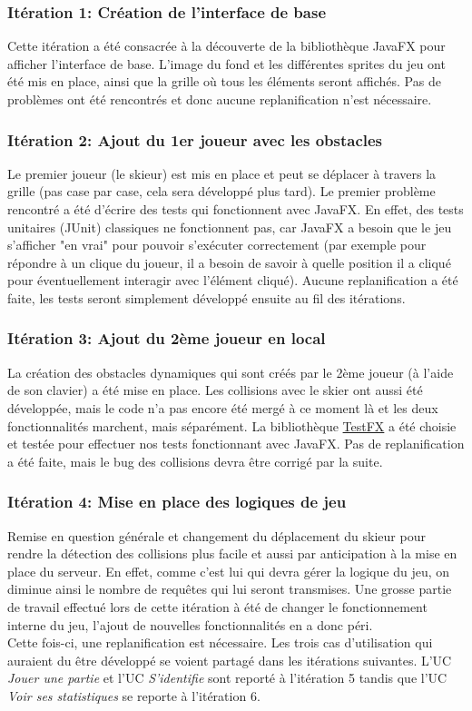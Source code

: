 \documentclass[a4paper,11pt]{article}
\begin{document}
	\subsubsection{Itération 1: Création de l'interface de base}
	Cette itération a été consacrée à la découverte de la bibliothèque JavaFX pour afficher l'interface de base. L'image du fond et les différentes sprites du jeu ont été mis en place, ainsi que la grille où tous les éléments seront affichés. Pas de problèmes ont été rencontrés et donc aucune replanification n'est nécessaire.
	
	\subsubsection{Itération 2: Ajout du 1er joueur avec les obstacles}
	Le premier joueur (le skieur) est mis en place et peut se déplacer à travers la grille (pas case par case, cela sera développé plus tard). Le premier problème rencontré a été d'écrire des tests qui fonctionnent avec JavaFX. En effet, des tests unitaires (JUnit) classiques ne fonctionnent pas, car JavaFX a besoin que le jeu s'afficher "en vrai" pour pouvoir s'exécuter correctement (par exemple pour répondre à un clique du joueur, il a besoin de savoir à quelle position il a cliqué pour éventuellement interagir avec l'élément cliqué). Aucune replanification a été faite, les tests seront simplement développé ensuite au fil des itérations.
	
	\subsubsection{Itération 3: Ajout du 2ème joueur en local}
	La création des obstacles dynamiques qui sont créés par le 2ème joueur (à l'aide de son clavier) a été mise en place. Les collisions avec le skier ont aussi été développée, mais le code n'a pas encore été mergé à ce moment là et les deux fonctionnalités marchent, mais séparément. La bibliothèque \href{https://github.com/TestFX/TestFX}{TestFX}	a été choisie et testée pour effectuer nos tests fonctionnant avec JavaFX. Pas de replanification a été faite, mais le bug des collisions devra être corrigé par la suite.
	
	\subsubsection{Itération 4: Mise en place des logiques de jeu}
	Remise en question générale et changement du déplacement du skieur pour rendre la détection des collisions plus facile et aussi par anticipation à la mise en place du serveur. En effet, comme c'est lui qui devra gérer la logique du jeu, on diminue ainsi le nombre de requêtes qui lui seront transmises. Une grosse partie de travail effectué lors de cette itération à été de changer le fonctionnement interne du jeu, l'ajout de nouvelles fonctionnalités en a donc péri. \\
	Cette fois-ci, une replanification est nécessaire. Les trois cas d'utilisation qui auraient du être développé se voient partagé dans les itérations suivantes. L'UC \textit{Jouer une partie} et l'UC \textit{S'identifie} sont reporté à l'itération 5 tandis que l'UC \textit{Voir ses statistiques} se reporte à l'itération 6.
	
\end{document}
